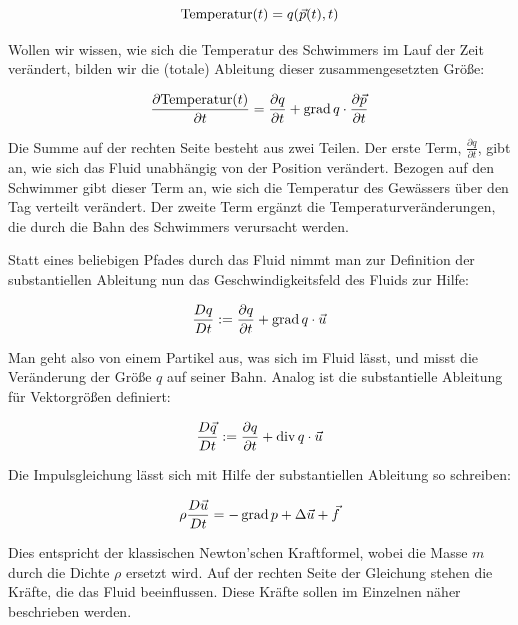 \begin{equation}
\textrm{Temperatur}(t) = q(\vec{p}(t),t)
\end{equation}

Wollen wir wissen, wie sich die Temperatur des Schwimmers im Lauf der Zeit
verändert, bilden wir die (totale) Ableitung dieser zusammengesetzten Größe:

\begin{equation}
\frac{
	\partial \textrm{Temperatur}(t)
}
{
	\partial t
}
=
\frac{
	\partial q
}
{
	\partial t
}
+
\operatorname*{grad} q \cdot
\frac{
	\partial \vec{p}}
{
	\partial t
}
\end{equation}

Die Summe auf der rechten Seite besteht aus zwei Teilen. Der erste Term,
$\frac{\partial q}{\partial t}$, gibt an, wie sich das Fluid unabhängig von
der Position verändert. Bezogen auf den Schwimmer gibt dieser Term an, wie
sich die Temperatur des Gewässers über den Tag verteilt verändert. Der
zweite Term ergänzt die Temperaturveränderungen, die durch die Bahn des
Schwimmers verursacht werden.

Statt eines beliebigen Pfades durch das Fluid nimmt man zur Definition der
substantiellen Ableitung nun das Geschwindigkeitsfeld des Fluids zur Hilfe:

\begin{equation}
\frac{
	Dq}
{
	Dt
} :=
\frac{
	\partial q
}
{
	\partial t
}
+
\operatorname*{grad} q \cdot
\vec{u}
\end{equation}

Man geht also von einem Partikel aus, was sich im Fluid 
lässt, und misst die Veränderung der Größe $q$ auf seiner Bahn. Analog ist die
substantielle Ableitung für Vektorgrößen definiert:

\begin{equation}
\frac{
	D\vec{q}}
{
	Dt
} :=
\frac{
	\partial q
}
{
	\partial t
}
+
\operatorname*{div} q \cdot
\vec{u}
\end{equation}

Die Impulsgleichung lässt sich mit Hilfe der substantiellen Ableitung so schreiben:

\begin{equation}
\rho \frac{D\vec{u}}{Dt} = - \operatorname*{grad} p + \Delta \vec{u} + \vec{f}
\end{equation}

Dies entspricht der klassischen Newton'schen Kraftformel, wobei die Masse $m$
durch die Dichte $\rho$ ersetzt wird. Auf der rechten Seite der Gleichung stehen
die Kräfte, die das Fluid beeinflussen. Diese Kräfte sollen im Einzelnen näher
beschrieben werden.


